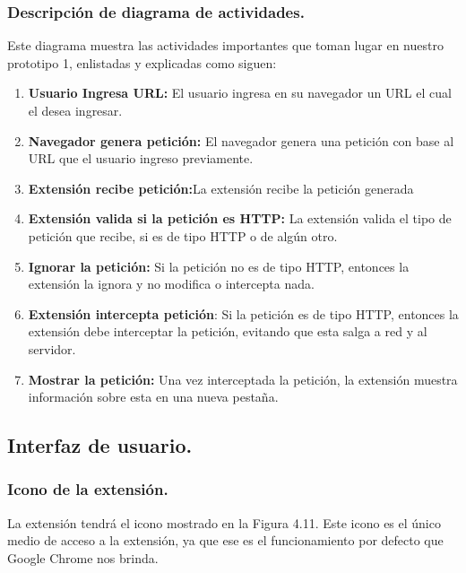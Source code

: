 \documentclass[12pt, a4paper, titlepage]{report}
\begin{document}
			\subsubsection{Descripción de diagrama de actividades.}
			Este diagrama muestra las actividades importantes que toman lugar en nuestro prototipo 1, enlistadas y explicadas como siguen: 
			
			\begin{enumerate}
			    \item \textbf{Usuario Ingresa URL:} El usuario ingresa en su navegador un URL el cual el desea ingresar.
			    \item \textbf{Navegador genera petición:} El navegador genera una petición con base al URL que el usuario ingreso previamente.
			    \item \textbf{Extensión recibe petición:}La extensión recibe la petición generada
			    \item \textbf{Extensión valida si la petición es HTTP:} La extensión valida el tipo de petición que recibe, si es de tipo HTTP o de algún otro.
			    \item \textbf{Ignorar la petición:} Si la petición no es de tipo HTTP, entonces la extensión la ignora y no modifica o intercepta nada.
			    \item \textbf{Extensión intercepta petición}: Si la petición es de tipo HTTP, entonces la extensión debe interceptar la petición, evitando que esta salga a red y al servidor.
			    \item \textbf{Mostrar la petición:} Una vez interceptada la petición, la extensión muestra información sobre esta en una nueva pestaña.
			\end{enumerate}
			
			    
			\subsection{Interfaz de usuario.}
			    
			    \subsubsection{Icono de la extensión.}
			    La extensión tendrá el icono mostrado en la Figura 4.11. Este icono es el único medio de acceso a la extensión, ya que ese es el funcionamiento por defecto que Google Chrome nos brinda.
			    
\end{document}
